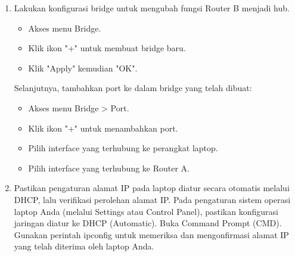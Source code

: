 \begin{enumerate}
    \item Lakukan konfigurasi bridge untuk mengubah fungsi Router B menjadi hub.
    \begin{itemize}
        \item Akses menu Bridge.
        \item Klik ikon "+" untuk membuat bridge baru.
        \item Klik "Apply" kemudian "OK".
    \end{itemize}

    Selanjutnya, tambahkan port ke dalam bridge yang telah dibuat:
    \begin{itemize}
        \item Akses menu Bridge > Port.
        \item Klik ikon "+" untuk menambahkan port.
        \item Pilih interface yang terhubung ke perangkat laptop.
        \item Pilih interface yang terhubung ke Router A.
    \end{itemize}

    \item Pastikan pengaturan alamat IP pada laptop diatur secara otomatis melalui DHCP, lalu verifikasi perolehan alamat IP. Pada pengaturan sistem operasi laptop Anda (melalui Settings atau Control Panel), pastikan konfigurasi jaringan diatur ke DHCP (Automatic). Buka Command Prompt (CMD). Gunakan perintah ipconfig untuk memeriksa dan mengonfirmasi alamat IP yang telah diterima oleh laptop Anda.


\end{enumerate}
